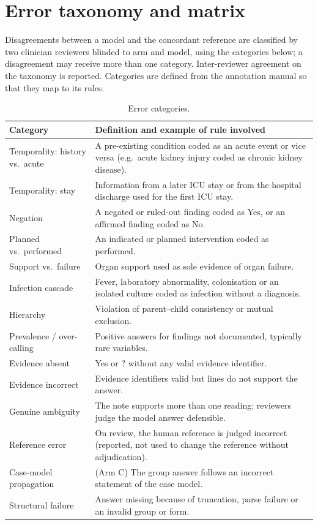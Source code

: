 \section{Error taxonomy and matrix}\label{app:errors}

Disagreements between a model and the concordant reference are classified by two clinician reviewers blinded to
arm and model, using the categories below; a disagreement may receive more than one category. Inter-reviewer
agreement on the taxonomy is reported. Categories are defined from the annotation manual so that they map to its
rules.

\begin{table}[h]
\centering\small
\caption{Error categories.}
\begin{tabularx}{\textwidth}{lY}
\toprule
Category & Definition and example of rule involved \\
\midrule
Temporality: history vs.\ acute & A pre-existing condition coded as an acute event or vice versa (e.g.\ acute kidney injury
coded as chronic kidney disease). \\
Temporality: stay & Information from a later ICU stay or from the hospital discharge used for the first ICU stay. \\
Negation & A negated or ruled-out finding coded as Yes, or an affirmed finding coded as No. \\
Planned vs.\ performed & An indicated or planned intervention coded as performed. \\
Support vs.\ failure & Organ support used as sole evidence of organ failure. \\
Infection cascade & Fever, laboratory abnormality, colonisation or an isolated culture coded as infection without a
diagnosis. \\
Hierarchy & Violation of parent--child consistency or mutual exclusion. \\
Prevalence / over-calling & Positive answers for findings not documented, typically rare variables. \\
Evidence absent & Yes or ? without any valid evidence identifier. \\
Evidence incorrect & Evidence identifiers valid but lines do not support the answer. \\
Genuine ambiguity & The note supports more than one reading; reviewers judge the model answer defensible. \\
Reference error & On review, the human reference is judged incorrect (reported, not used to change the reference
without adjudication). \\
Case-model propagation & (Arm C) The group answer follows an incorrect statement of the case model. \\
Structural failure & Answer missing because of truncation, parse failure or an invalid group or form. \\
\bottomrule
\end{tabularx}
\end{table}


